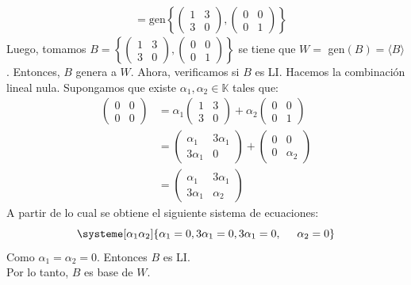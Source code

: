 \documentclass[compacto,10pt]{pubciencias-notas}
\begin{document}
\begin{ejem}
\begin{align*}
&=\text{gen}\left\lbrace \begin{pmatrix} 1 & 3\\ 3 & 0 \end{pmatrix},\begin{pmatrix} 0 & 0\\ 0 & 1 \end{pmatrix}\right\rbrace
\end{align*}
Luego, tomamos $B=\left\lbrace \begin{pmatrix} 1 & 3\\ 3 & 0 \end{pmatrix},\begin{pmatrix} 0 & 0\\ 0 & 1 \end{pmatrix}\right\rbrace$ se tiene que $W=$ gen$(B)=\langle B \rangle$. Entonces, $B$ genera a $W$.
Ahora, verificamos si $B$ es LI.
Hacemos la combinación lineal nula. Supongamos que existe $\alpha_1, \alpha_2 \in \mathbb{K} $ tales que:
\begin{align*}
\begin{pmatrix} 0 & 0\\ 0 & 0 \end{pmatrix} &=\alpha_1\begin{pmatrix} 1 & 3\\ 3 & 0 \end{pmatrix}+\alpha_2\begin{pmatrix} 0 & 0\\ 0 & 1 \end{pmatrix}\\
&=\begin{pmatrix} \alpha_1 & 3\alpha_1\\ 3\alpha_1 & 0 \end{pmatrix}+\begin{pmatrix} 0 & 0\\ 0 & \alpha_2 \end{pmatrix}\\
&=\begin{pmatrix} \alpha_1 & 3\alpha_1\\ 3\alpha_1 & \alpha_2 \end{pmatrix}
\end{align*}
A partir de lo cual se obtiene el siguiente sistema de ecuaciones:
\[
\systeme[\alpha_1  \alpha_2]{\alpha_1=0,
3\alpha_1=0,3\alpha_1=0,\hspace{0.5cm}\alpha_2=0}
\]
Como $\alpha_1=\alpha_2=0$. Entonces $B$ es LI.\\

Por lo tanto, $B$ es base de $W$.
\end{ejem}
\end{document}
